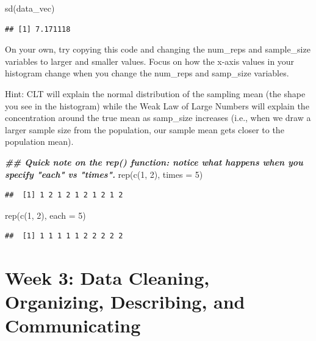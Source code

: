 \documentclass[
]{book}
\newenvironment{Shaded}{\begin{snugshade}}{\end{snugshade}}
\newcommand{\AttributeTok}[1]{\textcolor[rgb]{0.77,0.63,0.00}{#1}}
\newcommand{\DecValTok}[1]{\textcolor[rgb]{0.00,0.00,0.81}{#1}}
\newcommand{\DocumentationTok}[1]{\textcolor[rgb]{0.56,0.35,0.01}{\textbf{\textit{#1}}}}
\newcommand{\FunctionTok}[1]{\textcolor[rgb]{0.00,0.00,0.00}{#1}}
\newcommand{\NormalTok}[1]{#1}
\begin{document}
\begin{Shaded}
\begin{Highlighting}[]
\FunctionTok{sd}\NormalTok{(data\_vec)}
\end{Highlighting}
\end{Shaded}

\begin{verbatim}
## [1] 7.171118
\end{verbatim}

On your own, try copying this code and changing the num\_reps and sample\_size variables to larger and smaller values. Focus on how the x-axis values in your histogram change when you change the num\_reps and samp\_size variables.

Hint: CLT will explain the normal distribution of the sampling mean (the shape you see in the histogram) while the Weak Law of Large Numbers will explain the concentration around the true mean as samp\_size increases (i.e., when we draw a larger sample size from the population, our sample mean gets closer to the population mean).

\begin{Shaded}
\begin{Highlighting}[]
\DocumentationTok{\#\# Quick note on the rep() function: notice what happens when you specify "each" vs "times".}
\FunctionTok{rep}\NormalTok{(}\FunctionTok{c}\NormalTok{(}\DecValTok{1}\NormalTok{, }\DecValTok{2}\NormalTok{), }\AttributeTok{times =} \DecValTok{5}\NormalTok{)}
\end{Highlighting}
\end{Shaded}

\begin{verbatim}
##  [1] 1 2 1 2 1 2 1 2 1 2
\end{verbatim}

\begin{Shaded}
\begin{Highlighting}[]
\FunctionTok{rep}\NormalTok{(}\FunctionTok{c}\NormalTok{(}\DecValTok{1}\NormalTok{, }\DecValTok{2}\NormalTok{), }\AttributeTok{each =} \DecValTok{5}\NormalTok{)}
\end{Highlighting}
\end{Shaded}

\begin{verbatim}
##  [1] 1 1 1 1 1 2 2 2 2 2
\end{verbatim}

\hypertarget{week-3-data-cleaning-organizing-describing-and-communicating}{%
\chapter{Week 3: Data Cleaning, Organizing, Describing, and Communicating}\label{week-3-data-cleaning-organizing-describing-and-communicating}}
\end{document}
